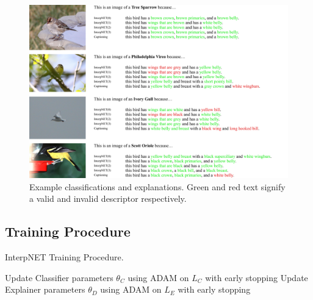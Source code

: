 \documentclass{article}
\begin{document}
\begin{figure}
  \centering
  \includegraphics[width=\linewidth]{figures/examples}
  \caption{Example classifications and explanations. Green and red text signify a valid and invalid descriptor respectively.}
  \label{fig:examples}
\end{figure}

\subsection{Training Procedure}

\begin{algorithm}
  \caption{InterpNET Training Procedure.}
  \label{alg2}
  \begin{algorithmic}
      \STATE Update Classifier parameters $\theta_C$ using ADAM on $L_C$ with early stopping
    \ENDWHILE
      \STATE Update Explainer parameters $\theta_D$ using ADAM on $L_E$ with early stopping
    \ENDWHILE
  \end{algorithmic}
\end{algorithm}
\end{document}
